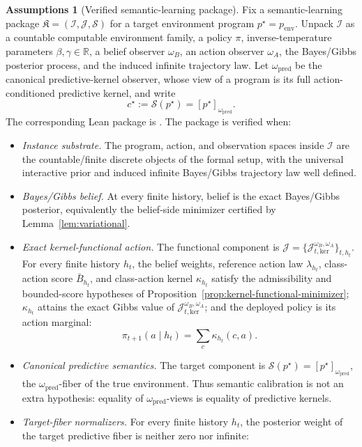\documentclass[11pt]{article}
\theoremstyle{definition}
\newtheorem{assumptions}[theorem]{Assumptions}
\theoremstyle{remark}
\theoremstyle{plain}
\theoremstyle{definition}
\newcommand{\Scal}{\mathcal{S}}
\begin{document}
\begin{assumptions}[Verified semantic-learning package]
\label{ass:main-verified-package}
Fix a semantic-learning package $\mathfrak K=(\mathcal I,\mathcal J,\Scal)$ for a target environment program $p^\star=p_{\mathrm{env}}$. Unpack $\mathcal I$ as a countable computable environment family, a policy $\pi$, inverse-temperature parameters $\beta,\gamma\in\mathbb R$, a belief observer $\omega_B$, an action observer $\omega_A$, the Bayes/Gibbs posterior process, and the induced infinite trajectory law. Let $\omega_{\mathrm{pred}}$ be the canonical predictive-kernel observer, whose view of a program is its full action-conditioned predictive kernel, and write
\[
c^\star:=\Scal(p^\star)=[p^\star]_{\omega_{\mathrm{pred}}}.
\]
The corresponding Lean package is . The package is verified when:
\begin{itemize}
\item[(M1)] \emph{Instance substrate.} The program, action, and observation spaces inside $\mathcal I$ are the countable/finite discrete objects of the formal setup, with the universal interactive prior and induced infinite Bayes/Gibbs trajectory law well defined.
\item[(M2)] \emph{Bayes/Gibbs belief.} At every finite history, belief is the exact Bayes/Gibbs posterior, equivalently the belief-side minimizer certified by Lemma~\ref{lem:variational}.
\item[(M3)] \emph{Exact kernel-functional action.} The functional component is $\mathcal J=\{\mathcal J_{t,\mathrm{ker}}^{\omega_B,\omega_A}\}_{t,h_t}$. For every finite history $h_t$, the belief weights, reference action law $\lambda_{h_t}$, class-action score $\bar B_{h_t}$, and class-action kernel $\kappa_{h_t}$ satisfy the admissibility and bounded-score hypotheses of Proposition~\ref{prop:kernel-functional-minimizer}; $\kappa_{h_t}$ attains the exact Gibbs value of $\mathcal J_{t,\mathrm{ker}}^{\omega_B,\omega_A}$; and the deployed policy is its action marginal:
\[
\pi_{t+1}(a\mid h_t)=\sum_c \kappa_{h_t}(c,a).
\]
\item[(M4)] \emph{Canonical predictive semantics.} The target component is $\Scal(p^\star)=[p^\star]_{\omega_{\mathrm{pred}}}$, the $\omega_{\mathrm{pred}}$-fiber of the true environment. Thus semantic calibration is not an extra hypothesis: equality of $\omega_{\mathrm{pred}}$-views is equality of predictive kernels.
\item[(M5)] \emph{Target-fiber normalizers.} For every finite history $h_t$, the posterior weight of the target predictive fiber is neither zero nor infinite:

\end{itemize}
\end{assumptions}
\end{document}
